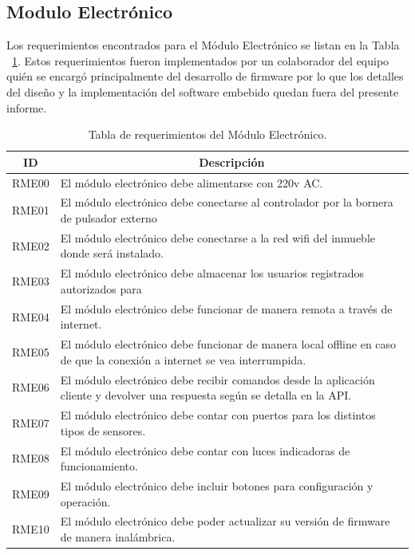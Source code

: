\subsection{Modulo Electrónico}
Los requerimientos encontrados para el Módulo Electrónico se listan en la Tabla ~\ref{table:req_modulo_electro}.
Estos requerimientos fueron implementados por un colaborador del equipo quién se encargó principalmente del desarrollo de firmware por lo que los detalles del diseño y la implementación del software embebido quedan fuera del presente informe. 
\begin{table}[ht]
	\begin{tabular}{|c|m{12cm}|}
		\hline
		\textbf{ID} & \multicolumn{1}{c|}{\textbf{Descripción}}                                                                                    \\ \hline
		RME00       & El módulo electrónico debe alimentarse con 220v AC.                                                                          \\ \hline
		RME01       & El módulo electrónico debe conectarse al controlador por la bornera de pulsador externo                                      \\ \hline
		RME02       & El módulo electrónico debe conectarse a la red wifi del inmueble donde será instalado.                                       \\ \hline
		RME03       & El módulo electrónico debe almacenar los usuarios registrados autorizados para                                               \\ \hline
		RME04       & El módulo electrónico debe funcionar de manera remota a través de internet.                                                  \\ \hline
		RME05       & El módulo electrónico debe funcionar de manera local offline en caso de que la conexión a internet se vea interrumpida.      \\ \hline
		RME06       & El módulo electrónico debe recibir comandos desde la aplicación cliente y devolver una respuesta según se detalla en la API. \\ \hline
		RME07       & El módulo electrónico debe contar con puertos para los distintos tipos de sensores.                                          \\ \hline
		RME08       & El módulo electrónico debe contar con luces indicadoras de funcionamiento.                                                   \\ \hline
		RME09       & El módulo electrónico debe incluir botones para configuración y operación.                                                   \\ \hline
		RME10       & El módulo electrónico debe poder actualizar su versión de firmware de manera inalámbrica.                                    \\ \hline
	\end{tabular}
	\caption[Requerimientos del Módulo Electrónico]{Tabla de requerimientos del Módulo Electrónico.}
	\label{table:req_modulo_electro}
\end{table}
